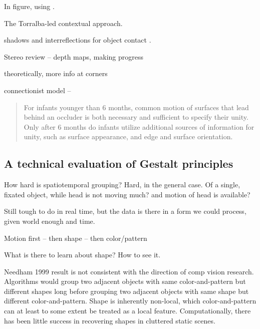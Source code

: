 In figure, using \cite{felzenszwalb04efficient}.

\cite{gibson88exploratory}

\cite{spelke90principles}

\cite{martin01database}

The Torralba-led contextual approach.


shadows and interreflections for object contact
\cite{madison01use}.


Stereo review -- depth maps, making progress
\cite{scharstein02taxonomy}

theoretically, more info at corners \cite{feldman05information}

connectionist model
\cite{mareschal02learning} --

\begin{quote}

For infants younger than 6 months, common motion of surfaces that lead
behind an occluder is both necessary and sufficient to specify their
unity. Only after 6 months do infants utilize additional sources of
information for unity, such as surface appearance, and edge and
surface orientation. \cite{mareschal02learning}

\end{quote}

\subsection{A technical evaluation of Gestalt principles}

How hard is spatiotemporal grouping?
Hard, in the general case.
Of a single, fixated object, while head is not moving much?  and
motion of head is available?

Still tough to do in real time, but the data is there in a form
we could process, given world enough and time.


Motion first -- then shape -- then color/pattern

What is there to learn about shape?  How to see it.

Needham 1999 result is not consistent with the direction of comp
vision research.  Algorithms would group two adjacent objects with
same color-and-pattern but different shapes long before grouping two
adjacent objects with same shape but different color-and-pattern.
Shape is inherently non-local, which color-and-pattern 
can at least to some extent be treated as a local feature.
Computationally, there 
has been little success in recovering shapes in cluttered static scenes.

